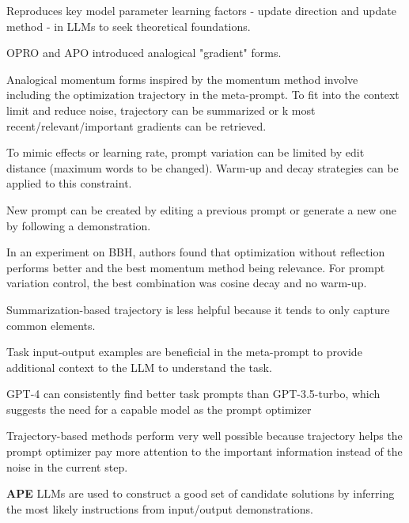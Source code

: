 Reproduces key model parameter learning factors - update direction and update method - in LLMs to seek theoretical foundations. \cite{tang2024unleashingpotentiallargelanguage}

OPRO\cite{yang2024largelanguagemodelsoptimizers} and APO\cite{pryzant2023automaticpromptoptimizationgradient} introduced analogical "gradient" forms. \cite{tang2024unleashingpotentiallargelanguage}

Analogical momentum forms inspired by the momentum method involve including the optimization trajectory in the meta-prompt. To fit into the context limit and reduce noise, trajectory can be summarized or k most recent/relevant/important gradients can be retrieved. \cite{tang2024unleashingpotentiallargelanguage}

To mimic effects or learning rate, prompt variation can be limited by edit distance (maximum words to be changed). Warm-up and decay strategies can be applied to this constraint. \cite{tang2024unleashingpotentiallargelanguage}

New prompt can be created by editing a previous prompt or generate a new one by following a demonstration. \cite{tang2024unleashingpotentiallargelanguage}

In an experiment on BBH, authors found that optimization without reflection performs better and the best momentum method being relevance. For prompt variation control, the best combination was cosine decay and no warm-up.  \cite{tang2024unleashingpotentiallargelanguage}

Summarization-based trajectory is less helpful because it tends to only capture common elements. \cite{tang2024unleashingpotentiallargelanguage}

Task input-output examples are beneficial in the meta-prompt to provide additional context to the LLM to understand the task. \cite{tang2024unleashingpotentiallargelanguage}

GPT-4 can consistently find better task prompts than GPT-3.5-turbo, which suggests the need for a capable model as the prompt optimizer \cite{tang2024unleashingpotentiallargelanguage}

Trajectory-based methods perform very well possible because trajectory helps the prompt optimizer pay more attention to the important information instead of the noise in the current step. \cite{tang2024unleashingpotentiallargelanguage}

\textbf{APE}
LLMs are used to construct a good set of candidate solutions by inferring the most likely instructions from input/output demonstrations. \cite{zhou2023largelanguagemodelshumanlevel}

